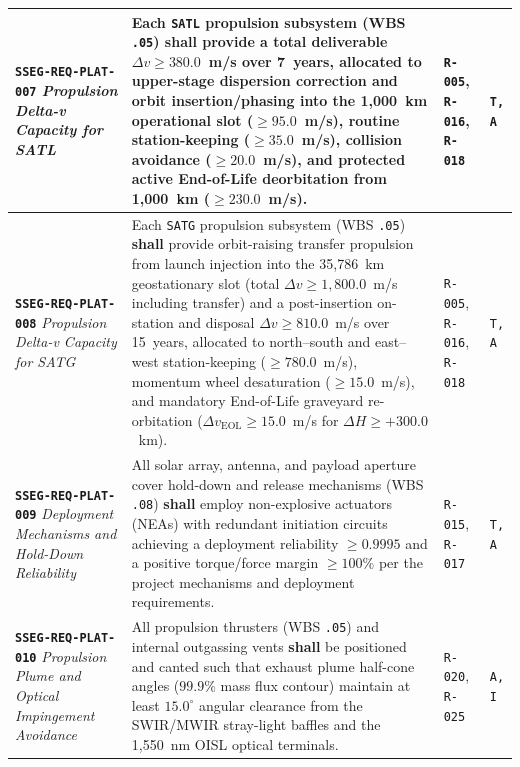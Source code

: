 \documentclass[11pt,a4paper]{article}
\providecommand{\abbr}[1]{#1}
\begin{document}
{\begin{longtable}{|>{\raggedright\arraybackslash}p{}|>{\raggedright\arraybackslash}p{}|>{\raggedright\arraybackslash}p{}|>{\raggedright\arraybackslash}p{}|}
\textbf{\texttt{SSEG-REQ-PLAT-007}} \newline \emph{Propulsion Delta-v Capacity for SATL} & Each \texttt{SATL} propulsion subsystem (\abbr{WBS} \texttt{.05}) \textbf{shall} provide a total deliverable $\Delta v \ge 380.0$~m/s over 7~years, allocated to upper-stage dispersion correction and orbit insertion/phasing into the 1,000~km operational slot ($\ge 95.0$~m/s), routine station-keeping ($\ge 35.0$~m/s), collision avoidance ($\ge 20.0$~m/s), and protected active End-of-Life deorbitation from 1,000~km ($\ge 230.0$~m/s). & \texttt{R-005}, \texttt{R-016}, \texttt{R-018} & \texttt{T, A} \\ \hline
\textbf{\texttt{SSEG-REQ-PLAT-008}} \newline \emph{Propulsion Delta-v Capacity for SATG} & Each \texttt{SATG} propulsion subsystem (\abbr{WBS} \texttt{.05}) \textbf{shall} provide orbit-raising transfer propulsion from launch injection into the 35,786~km geostationary slot (total $\Delta v \ge 1{,}800.0$~m/s including transfer) and a post-insertion on-station and disposal $\Delta v \ge 810.0$~m/s over 15~years, allocated to north--south and east--west station-keeping ($\ge 780.0$~m/s), momentum wheel desaturation ($\ge 15.0$~m/s), and mandatory End-of-Life graveyard re-orbitation ($\Delta v_{\text{EOL}} \ge 15.0$~m/s for $\Delta H \ge +300.0$~km). & \texttt{R-005}, \texttt{R-016}, \texttt{R-018} & \texttt{T, A} \\ \hline
\textbf{\texttt{SSEG-REQ-PLAT-009}} \newline \emph{Deployment Mechanisms and Hold-Down Reliability} & All solar array, antenna, and payload aperture cover hold-down and release mechanisms (\abbr{WBS} \texttt{.08}) \textbf{shall} employ non-explosive actuators (\abbr{NEA}s) with redundant initiation circuits achieving a deployment reliability $\ge 0.9995$ and a positive torque/force margin $\ge 100\%$ per the project mechanisms and deployment requirements. & \texttt{R-015}, \texttt{R-017} & \texttt{T, A} \\ \hline
\textbf{\texttt{SSEG-REQ-PLAT-010}} \newline \emph{Propulsion Plume and Optical Impingement Avoidance} & All propulsion thrusters (\abbr{WBS} \texttt{.05}) and internal outgassing vents \textbf{shall} be positioned and canted such that exhaust plume half-cone angles ($99.9\%$ mass flux contour) maintain at least $15.0^\circ$ angular clearance from the \abbr{SWIR}/\abbr{MWIR} stray-light baffles and the 1,550~nm \abbr{OISL} optical terminals. & \texttt{R-020}, \newline \texttt{R-025} & \texttt{A, I} \\ \hline
\end{longtable}}
\end{document}
